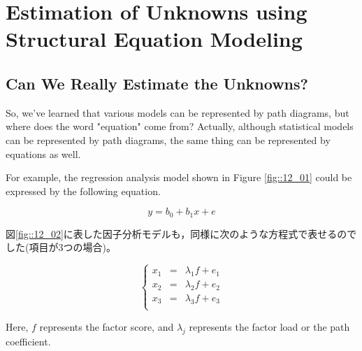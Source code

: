 \documentclass{ltjsbook}
\begin{document}
\section{Estimation of Unknowns using Structural Equation Modeling}
\subsection{Can We Really Estimate the Unknowns?}
So, we've learned that various models can be represented by path diagrams, but where does the word "equation" come from?
Actually, although statistical models can be represented by path diagrams, the same thing can be represented by equations as well.

For example, the regression analysis model shown in Figure \ref{fig::12_01} could be expressed by the following equation.

\[ y = b_0 + b_1 x + e \]

図\ref{fig::12_02}に表した因子分析モデルも，同様に次のような方程式で表せるのでした(項目が3つの場合)。

\[ \left \{
	\begin{array}{rcl}
		x_1 & = & \lambda_1 f + e_1 \\
		x_2 & = & \lambda_2 f + e_2 \\
		x_3 & = & \lambda_3 f + e_3 \\
	\end{array}
	\right .
\]

Here, $f$ represents the factor score, and $\lambda_j$ represents the factor load or the path coefficient.
\end{document}
